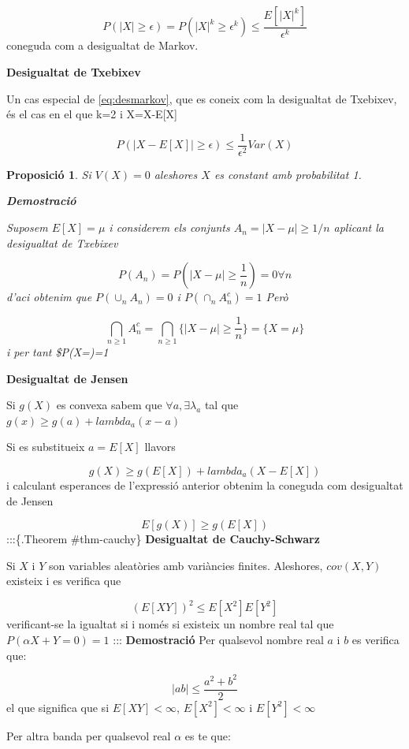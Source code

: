 \documentclass[
  catalan,
]{article}
\newtheorem{proposition}{Proposició}[section]
\theoremstyle{definition}
\theoremstyle{definition}
\theoremstyle{definition}
\theoremstyle{definition}
\theoremstyle{remark}
\begin{document}
\[
 P(|X| \geq \epsilon)=P(|X|^k \geq \epsilon^k) \leq \dfrac{E[|X|^k]}{\epsilon^k}    \label{eq:desmarkov}
 \]
coneguda com a desigualtat de Markov.

\textbf{Desigualtat de Txebixev}

Un cas especial de \eqref{eq:desmarkov}, que es coneix com la desigualtat de Txebixev, és el cas en el que k=2 i X=X-E{[}X{]}

\[
 P(|X-E[X]| \geq \epsilon) \leq \frac {1}{\epsilon^2}Var(X)     \label{eq:destxebixev}
 \]

\begin{proposition}
Si \(V(X)=0\) aleshores \(X\) es constant amb probabilitat 1.

\textbf{Demostració}

Suposem \(E[X]=\mu\) i considerem els conjunts \(A_n={|X-\mu| \geq 1/n}\) aplicant la desigualtat de Txebixev

\[
P(A_n)= P(|X-\mu| \geq\frac{1}{n})=0 \forall n
\]
d'aci obtenim que \(P(\cup_n A_n)=0\) i \(P(\cap_n A_n^c)=1\) Però

\[
\bigcap_{n\geq1} A_n^c=\bigcap_{n\geq1} \{  |X-\mu| \geq \frac{1}{n} \}=\{X=\mu \}
\]
i per tant \$P(X=\mu)=1
\end{proposition}

\textbf{Desigualtat de Jensen}

Si \(g(X)\) es convexa sabem que \(\forall a, \exists \lambda_a\) tal que \(g(x) \geq g(a)+lambda_a(x-a)\)

Si es substitueix \(a=E[X]\) llavors

\[
 g(X) \geq g(E[X])+lambda_a(X-E[X]) 
 \]
i calculant esperances de l'expressió anterior obtenim la coneguda com desigualtat de Jensen

\[
 E[g(X)] \geq g(E[X])   \label{eq:desjensen}
 \]
:::\{.Theorem \#thm-cauchy\}
\textbf{Desigualtat de Cauchy-Schwarz}

Si \(X\) i \(Y\) son variables aleatòries amb variàncies finites. Aleshores, \(cov(X,Y)\) existeix i es verifica que

\[
(E[XY])^2 \leq E[X^2]E[Y^2]  \label{eq:descauchy}
\]
verificant-se la igualtat si i només si existeix un nombre real tal que \(P(\alpha X+Y=0)=1\)
:::
\textbf{Demostració}
Per qualsevol nombre real \(a\) i \(b\) es verifica que:

\[
|ab| \leq \dfrac {a^2+b^2}{2}
\]
el que significa que si \(E[XY]<\infty\), \(E[X^2]<\infty\) i \(E[Y^2]<\infty\)

Per altra banda per qualsevol real \(\alpha\) es te que:
\end{document}
